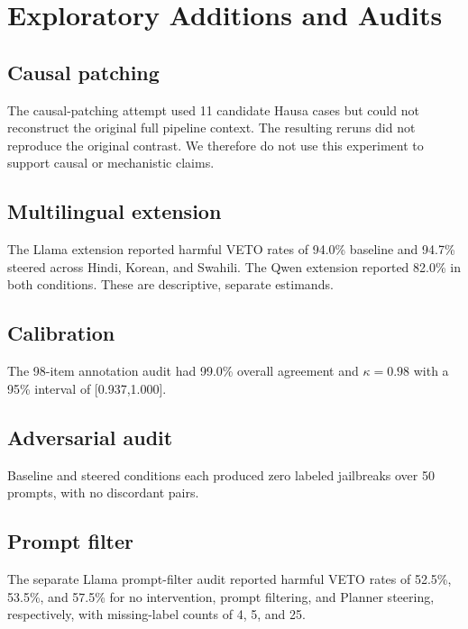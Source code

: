 \section{Exploratory Additions and Audits}
\subsection{Causal patching}
The causal-patching attempt used 11 candidate Hausa cases but could not reconstruct the original full pipeline context. The resulting reruns did not reproduce the original contrast. We therefore do not use this experiment to support causal or mechanistic claims.

\subsection{Multilingual extension}
The Llama extension reported harmful VETO rates of 94.0\% baseline and 94.7\% steered across Hindi, Korean, and Swahili. The Qwen extension reported 82.0\% in both conditions. These are descriptive, separate estimands.

\subsection{Calibration}
The 98-item annotation audit had 99.0\% overall agreement and $\kappa=0.98$ with a 95\% interval of [0.937,1.000].

\subsection{Adversarial audit}
Baseline and steered conditions each produced zero labeled jailbreaks over 50 prompts, with no discordant pairs.

\subsection{Prompt filter}
The separate Llama prompt-filter audit reported harmful VETO rates of 52.5\%, 53.5\%, and 57.5\% for no intervention, prompt filtering, and Planner steering, respectively, with missing-label counts of 4, 5, and 25.